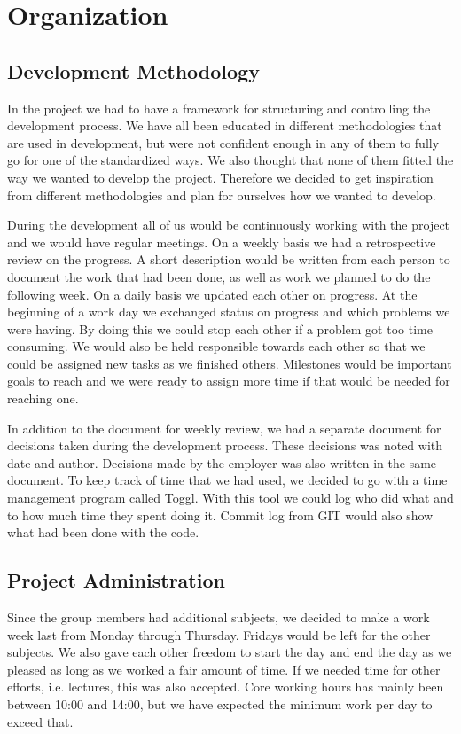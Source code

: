 \section{Organization}
\label{sec:organization}

\subsection{Development Methodology}
\label{subsec:development_methodology}
In the project we had to have a framework for structuring and controlling the
development process. We have all been educated in different methodologies that
are used in development, but were not confident enough in any of them to fully
go for one of the standardized ways. We also thought that none of them fitted 
the way we wanted to develop the project. Therefore we decided to get inspiration
from different methodologies and plan for ourselves how we wanted to develop.

During the development all of us would be continuously working with the project and we would have
regular meetings. On a weekly basis we had a retrospective review on
the progress. A short description would be written from each person to
document the work that had been done, as well as work we planned to do the
following week. On a daily basis we updated each other on progress. At
the beginning of a work day we exchanged status on progress and which
problems we were having. By doing this we could stop each other if a problem
got too time consuming. We would also be held responsible towards each other so
that we could be assigned new tasks as we finished others. Milestones would be
important goals to reach and we were ready to assign more time if that
would be needed for reaching one.

In addition to the document for weekly review, we had a separate
document for decisions taken during the development process. These decisions
was noted with date and author. Decisions made by the employer was
also written in the same document. To keep track of time that we had used,
we decided to go with a time management program called Toggl\cite{Toggl}. With this tool we
could log who did what and to how much time they spent doing it. Commit log from GIT would
also show what had been done with the code.


\subsection{Project Administration}
\label{subsec:project_administration}
Since the group members had additional subjects, we decided to make a work week
last from Monday through Thursday. Fridays would be left for the other
subjects. We also gave each other freedom to start the day and end the day as
we pleased as long as we worked a fair amount of time. If we needed time for
other efforts, i.e. lectures, this was also accepted. Core working hours has
mainly been between 10:00 and 14:00, but we have expected the minimum work per
day to exceed that.

